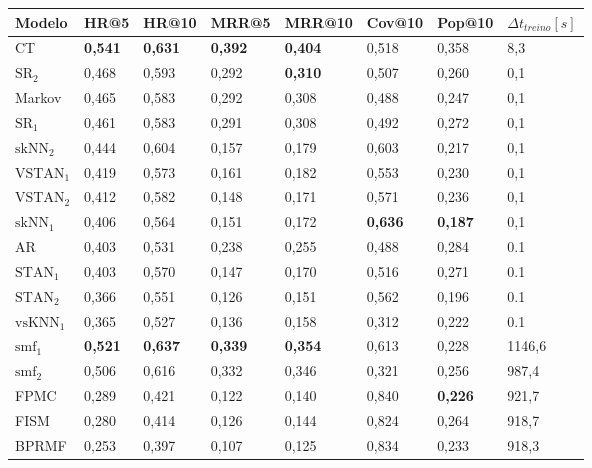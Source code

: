 \begin{table}[htbp]
  \centering
  \begin{tabular}{|l|l|l|l|l|l|l|l|}
    \hline
    Modelo & HR@5 & HR@10 & MRR@5 & MRR@10 & Cov@10 & Pop@10 & $\Delta t_{treino} [s]$ \\
    \hline
    CT & \textbf{0,541} & \textbf{0,631} & \textbf{0,392} & \textbf{0,404} & 0,518 & 0,358 & 8,3 \\
    \hline        
    $\text{SR}_{2}$ & 0,468 & 0,593 & 0,292 & \textbf{0,310} & 0,507 & 0,260 & 0,1 \\
    \hline
    Markov  & 0,465 & 0,583 & 0,292 & 0,308 & 0,488 & 0,247 & 0,1 \\
    \hline
    $\text{SR}_{1}$ & 0,461 & 0,583 & 0,291 & 0,308 & 0,492 & 0,272 & 0,1 \\
    \hline
    $\text{skNN}_{2}$ & 0,444 & 0,604 & 0,157 & 0,179 & 0,603 & 0,217 & 0,1 \\
    \hline
    $\text{VSTAN}_{1}$ & 0,419 & 0,573 & 0,161 & 0,182 & 0,553 & 0,230 & 0,1 \\
    \hline
    $\text{VSTAN}_{2}$ & 0,412 & 0,582 & 0,148 & 0,171 & 0,571 & 0,236 & 0,1 \\
    \hline
    $\text{skNN}_{1}$ & 0,406 & 0,564 & 0,151 & 0,172 & \textbf{0,636} & \textbf{0,187} & 0,1 \\
    \hline
    AR & 0,403 & 0,531 & 0,238 & 0,255 & 0,488 & 0,284 & 0.1 \\
    \hline
    $\text{STAN}_{1}$ & 0,403 & 0,570 & 0,147 & 0,170 & 0,516 & 0,271 & 0.1 \\
    \hline
    $\text{STAN}_{2}$ & 0,366 & 0,551 & 0,126 & 0,151 & 0,562 & 0,196 & 0.1 \\
    \hline
$\text{vsKNN}_{1}$ & 0,365 & 0,527 & 0,136 & 0,158 & 0,312 & 0,222 & 0.1 \\
\hline
\hline
    $\text{smf}_1$ & \textbf{0,521} & \textbf{0,637} & \textbf{0,339} & \textbf{0,354} & 0,613 & 0,228 & 1146,6 \\
    \hline
    $\text{smf}_2$ & 0,506 & 0,616 & 0,332 & 0,346 & 0,321 & 0,256 & 987,4 \\
    \hline
    FPMC & 0,289 & 0,421 & 0,122 & 0,140 & 0,840 & \textbf{0,226} & 921,7 \\
    \hline
    FISM & 0,280 & 0,414 & 0,126 & 0,144 & 0,824 & 0,264 & 918,7 \\
    \hline
    BPRMF & 0,253 & 0,397 & 0,107 & 0,125 & 0,834 & 0,233 & 918,3 \\

\end{tabular}
\end{table}
